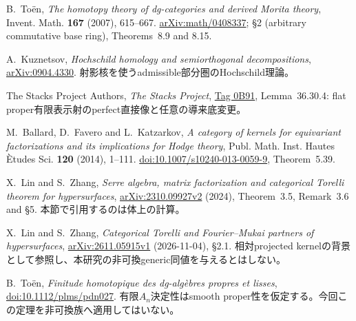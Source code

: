 B.~To\"en, \emph{The homotopy theory of dg-categories and derived Morita theory},
Invent. Math. \textbf{167} (2007), 615--667.
\href{https://arxiv.org/abs/math/0408337}{arXiv:math/0408337};
\S2 (arbitrary commutative base ring), Theorems~8.9 and 8.15.

A.~Kuznetsov, \emph{Hochschild homology and semiorthogonal decompositions},
\href{https://arxiv.org/abs/0904.4330}{arXiv:0904.4330}.
射影核を使うadmissible部分圏のHochschild理論。

The Stacks Project Authors, \emph{The Stacks Project},
\href{https://stacks.math.columbia.edu/tag/0B91}{Tag 0B91}, Lemma~36.30.4:
flat proper有限表示射のperfect直接像と任意の導来底変更。

M.~Ballard, D.~Favero and L.~Katzarkov,
\emph{A category of kernels for equivariant factorizations and its implications for Hodge theory},
Publ. Math. Inst. Hautes \`Etudes Sci. \textbf{120} (2014), 1--111.
\href{https://doi.org/10.1007/s10240-013-0059-9}{doi:10.1007/s10240-013-0059-9}, Theorem~5.39.

X.~Lin and S.~Zhang, \emph{Serre algebra, matrix factorization and categorical Torelli theorem for hypersurfaces},
\href{https://arxiv.org/abs/2310.09927v2}{arXiv:2310.09927v2} (2024),
Theorem~3.5, Remark~3.6 and \S5. 本節で引用するのは体上の計算。

X.~Lin and S.~Zhang, \emph{Categorical Torelli and Fourier--Mukai partners of hypersurfaces},
\href{https://arxiv.org/abs/2611.05915v1}{arXiv:2611.05915v1} (2026-11-04), \S2.1.
相対projected kernelの背景として参照し、本研究の非可換generic同値を与えるとはしない。

B.~To\"en, \emph{Finitude homotopique des dg-alg\`ebres propres et lisses},
\href{https://doi.org/10.1112/plms/pdn027}{doi:10.1112/plms/pdn027}.
有限$A_n$決定性はsmooth proper性を仮定する。今回この定理を非可換族へ適用してはいない。

